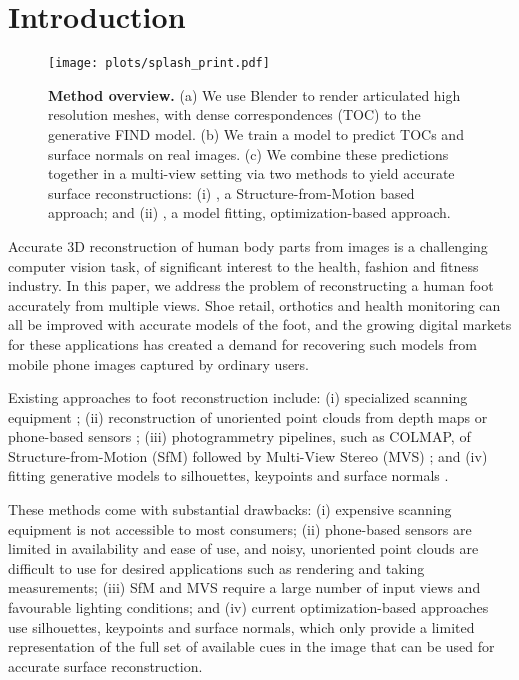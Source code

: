 \section{Introduction}
\label{sec:intro}

\begin{figure}
    \centering
    \texttt{[image: plots/splash\_print.pdf]}
    \caption{\textbf{Method overview.} (a) We use Blender \cite{blender} to render articulated high resolution meshes, with dense correspondences (TOC) to the generative FIND \cite{boyne2022find} model. (b) We train a model to predict TOCs and surface normals on real images. (c) We combine these predictions together in a multi-view setting via two methods to yield accurate surface reconstructions: (i) \ourSfM, a Structure-from-Motion based approach; and (ii) \ourOptim, a model fitting, optimization-based approach.}
    \label{fig:splash}
\end{figure}

Accurate 3D reconstruction of human body parts from images is a challenging computer vision task, of significant interest to the health, fashion and fitness industry. In this paper, we address the problem of reconstructing a human foot accurately from multiple views. Shoe retail, orthotics and health monitoring can all be improved with accurate models of the foot, and the growing digital markets for these applications has created a demand for recovering such models from mobile phone images captured by ordinary users.

Existing approaches to foot reconstruction include: (i) specialized scanning equipment \cite{ArtecLeo, Volumental}; (ii) reconstruction of unoriented point clouds from depth maps or phone-based sensors \cite{xesto, lunscher2017point}; (iii) photogrammetry pipelines, such as COLMAP, of Structure-from-Motion (SfM) followed by Multi-View Stereo (MVS) \cite{schonberger2016structure, schonberger2016pixelwise}; and (iv) fitting generative models to silhouettes, keypoints and surface normals \cite{kok2020footnet, boyne2024found}.

These methods come with substantial drawbacks: (i) expensive scanning equipment is not accessible to most consumers; (ii) phone-based sensors are limited in availability and ease of use, and noisy, unoriented point clouds are difficult to use for desired applications such as rendering and taking measurements; (iii) SfM and MVS require a large number of input views and favourable lighting conditions; and (iv) current optimization-based approaches use silhouettes, keypoints and surface normals, which only provide a limited representation of the full set of available cues in the image that can be used for accurate surface reconstruction.

